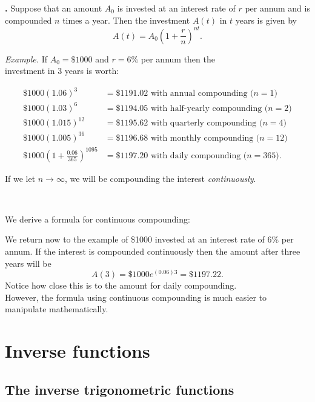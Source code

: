 \documentclass[t]{beamer}
\theoremstyle{plain}
\theoremstyle{definition}
\newcounter{heading}
\newcommand{\newhead}[1]{\medskip\stepcounter{heading}\noindent\textbf{\hspace{0.2cm}{#1}.}}
\begin{document}
\begin{frame}
\newhead{Compound interest} Suppose that an amount $A_0$ is invested at an interest rate of $r$ per annum and is compounded $n$ times a year. Then the investment $A(t)$ in $t$ years is given by
\[A(t)=A_0\left(1+\frac{r}{n}\right)^{nt}.\]\pause

\noindent\textit{Example.} If $A_0=\$1000$ and $r=6\%$ per annum then the\\ investment in 3 years is worth:\pause
\begin{footnotesize}
\begin{align*}
\$1000(1.06)^3&=\$1191.02 \mbox{ with annual compounding ($n=1$)} \\
\$1000(1.03)^6&=\$1194.05  \mbox{ with half-yearly compounding ($n=2$)} \\
\$1000(1.015)^{12}&=\$1195.62  \mbox{ with quarterly compounding ($n=4$)} \\
\$1000(1.005)^{36}&=\$1196.68  \mbox{ with monthly compounding ($n=12$)} \\
\$1000\left(1+\frac{0.06}{365}\right)^{1095}&=\$1197.20  \mbox{ with daily compounding ($n=365$)}.
\end{align*}
\end{footnotesize}\pause

\noindent If we let $n\to\infty$, we will be compounding the interest \textit{continuously}.

\

\end{frame}

\begin{frame}
\noindent We derive a formula for continuous compounding:\pause

\medskip

\noindent We return now to the example of \$1000 invested at an interest rate of 6\% per annum. If the interest is compounded continuously then the amount after three years will be
\[A(3)=\$1000e^{(0.06)3}=\$1197.22.\]\pause
Notice how close this is to the amount for daily compounding. \\However, the formula using continuous compounding is much easier to manipulate mathematically.
\end{frame}

\section{Inverse  functions}
\subsection{The inverse trigonometric functions}
\end{document}

